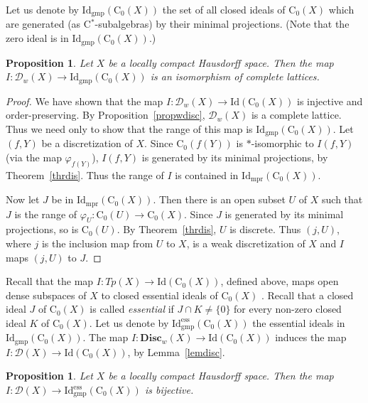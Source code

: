 \documentclass[manuscript]{amsart}
\newtheorem{proposition}[theorem]{Proposition}
\theoremstyle{definition}
\begin{document}
Let us denote by $\mathrm{Id_{gmp}}( \mathrm{C}_{0}(X))$ the set of
all closed  ideals of $ \mathrm{C}_{0}(X)$ which are generated (as
C$^{*}$-subalgebras) by their minimal projections. (Note that the zero ideal
is in $\mathrm{Id_{gmp}}( \mathrm{C}_{0}(X))$.)
\begin{proposition}\label{propgmp}
Let $X$ be a locally compact Hausdorff space. Then the map
$I: \mathcal{D}_{w}(X)\to \mathrm{Id_{gmp}}(\mathrm{C}_{0}(X))$
is an isomorphism of complete lattices.
\end{proposition}
\begin{proof}
We have shown that the map $I: \mathcal{D}_{w}(X)\to \mathrm{Id}( \mathrm{C}_{0}(X))$
is  injective and order-preserving. By Proposition~\ref{propwdisc},
$\mathcal{D}_{w}(X)$ is a complete lattice. Thus we need only to show that the range of
this map is $\mathrm{Id_{gmp}}(\mathrm{C}_{0}(X))$.
Let $(f,Y)$ be a discretization of $X$. Since $\mathrm{C}_{0}(f(Y))$
is $*$-isomorphic to $I(f,Y)$ (via the map $\varphi_{f(Y)}$),
$I(f,Y)$ is generated by its minimal projections, by Theorem~\ref{thrdis}.
Thus the range of $I$ is contained in $\mathrm{Id_{mpr}}(\mathrm{C}_{0}(X))$.

Now let $J$ be in $\mathrm{Id_{mpr}}(\mathrm{C}_{0}(X))$.
Then there is an open subset $U$ of $X$ such that $J$ is the range of
$\varphi_{U}: \mathrm{C}_{0}(U)\to \mathrm{C}_{0}(X)$.
Since $J$ is generated by its minimal projections, so is
$\mathrm{C}_{0}(U)$. By Theorem~\ref{thrdis}, $U$ is discrete.
Thus $(j,U)$, where $j$ is the inclusion map from $U$ to $X$, is a weak discretization of $X$ and $I$ maps
$(j,U)$ to $J$.
\end{proof}
Recall that the map  $I:Tp(X)\to \mathrm{Id}(\mathrm{C}_{0}(X))$, defined above,
maps open dense subspaces of $X$ to closed essential ideals of
$\mathrm{C}_{0}(X)$ \cite[Exercise~2.A]{wo93}. Recall that
a closed ideal $J$ of $\mathrm{C}_{0}(X)$ is called \textit{essential} if
$J\cap K\neq \{0\}$ for every non-zero closed ideal $K$ of $\mathrm{C}_{0}(X)$.
Let us denote by
$\mathrm{Id_{gmp}^{ess}}(\mathrm{C}_{0}(X))$ the essential ideals in
$\mathrm{Id_{gmp}}(\mathrm{C}_{0}(X))$.
The map $I: \mathbf{Disc}_{w}(X)\to \mathrm{Id}( \mathrm{C}_{0}(X))$
induces the  map $I: \mathcal{D}(X)\to \mathrm{Id}( \mathrm{C}_{0}(X))$,
by Lemma~\ref{lemdisc}.
\begin{proposition}\label{propess}
Let $X$ be a locally compact Hausdorff space. Then the map
$I: \mathcal{D}(X)\to \mathrm{Id_{gmp}^{ess}}(\mathrm{C}_{0}(X))$
is bijective.
\end{proposition}
\end{document}
